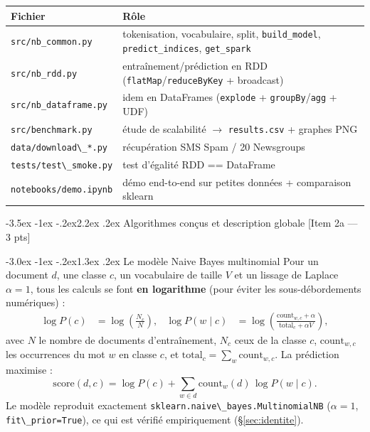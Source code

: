 \documentclass[11pt,a4paper]{article}
\makeatletter
\newcommand{\code}[1]{\lstinline[style=py]!#1!}
\renewcommand\section{\@startsection{section}{1}{\z@}%
  {-3.5ex \@plus -1ex \@minus -.2ex}{2.2ex \@plus.2ex}%
  {\normalfont\Large\bfseries\color{primary}}}
\renewcommand\subsection{\@startsection{subsection}{2}{\z@}%
  {-3.0ex \@plus -1ex \@minus -.2ex}{1.3ex \@plus.2ex}%
  {\normalfont\large\bfseries\color{primary!88!black}}}
\makeatother
\begin{document}
\begin{table}[H]
\centering\small
\begin{tabular}{@{}ll@{}}
\toprule
\textbf{Fichier} & \textbf{Rôle} \\
\midrule
\code{src/nb_common.py}    & tokenisation, vocabulaire, split, \code{build_model}, \code{predict_indices}, \code{get_spark} \\
\code{src/nb_rdd.py}       & entraînement/prédiction en RDD (\code{flatMap}/\code{reduceByKey} + broadcast) \\
\code{src/nb_dataframe.py} & idem en DataFrames (\code{explode} + \code{groupBy}/\code{agg} + UDF) \\
\code{src/benchmark.py}    & étude de scalabilité $\to$ \code{results.csv} + graphes PNG \\
\code{data/download\_*.py}  & récupération SMS Spam / 20 Newsgroups \\
\code{tests/test\_smoke.py} & test d'égalité RDD == DataFrame \\
\code{notebooks/demo.ipynb} & démo end-to-end sur petites données + comparaison sklearn \\
\bottomrule
\end{tabular}
\end{table}

\section{Algorithmes conçus et description globale \hfill\normalsize\textmd{[Item 2a --- 3 pts]}}
\label{sec:algos}

\subsection{Le modèle Naive Bayes multinomial}
Pour un document $d$, une classe $c$, un vocabulaire de taille $V$ et un lissage de Laplace
$\alpha=1$, tous les calculs se font \textbf{en logarithme} (pour éviter les
sous-débordements numériques) :
\begin{align}
  \log P(c)      &= \log\!\left( \frac{N_c}{N} \right), &
  \log P(w \mid c) &= \log\!\left( \frac{\mathrm{count}_{w,c} + \alpha}{\mathrm{total}_c + \alpha V} \right),
\end{align}
avec $N$ le nombre de documents d'entraînement, $N_c$ ceux de la classe $c$,
$\mathrm{count}_{w,c}$ les occurrences du mot $w$ en classe $c$, et
$\mathrm{total}_c=\sum_w \mathrm{count}_{w,c}$. La prédiction maximise :
\begin{equation}
  \mathrm{score}(d,c) = \log P(c) + \sum_{w\in d}\mathrm{count}_w(d)\,\log P(w\mid c).
\end{equation}
Le modèle reproduit exactement \code{sklearn.naive\_bayes.MultinomialNB} ($\alpha=1$,
\code{fit\_prior=True}), ce qui est vérifié empiriquement (\S\ref{sec:identite}).
\end{document}
